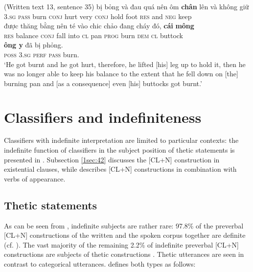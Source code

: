 \documentclass[output=paper]{langsci/langscibook}
\begin{document}
\begin{exe}
\ex\label{1ex:27}
(Written text 13, sentence 35)
\exi{}
  bị        bỏng  và         đau  quá   nên       ôm    {\textbf{chân}}  lên    và   không  giữ  \\
3.{\textsc{sg}}     {\textsc{pass}}  burn   {\textsc{conj}}  hurt  very  {\textsc{conj}}   hold  foot   {\textsc{res}}  and {\textsc{neg}}   keep \\
\glt
\exi{}
\gll được	 {thăng bằng}   nên      té   vào   chi{\dae}c chảo đang    cháy  đó,       {\textbf{cái}}   {\textbf{mông}} \\
{\textsc{res}}  balance          {\textsc{conj}}  fall into   {\textsc{cl}}    pan   {\textsc{prog}} burn   {\textsc{dem}}  {\textsc{cl}}  buttock \\
\exi{}
     {\textbf{ông {\daa}y}}  đã        bị        phỏng. \\
{\textsc{poss}} {\textsc{3.sg}}     {\textsc{perf}}  {\textsc{pass}}  burn.\\
\glt `He got burnt and he got hurt, therefore, he lifted [his] leg up to hold it, then he was no longer able to keep his balance to the extent that he fell down on [the] burning pan and [as a consequence] even [his] buttocks got burnt.'
\end{exe}


\section{Classifiers and indefiniteness}\label{sec:4}

Classifiers with indefinite interpretation are limited to particular contexts: the indefinite function of classifiers in the subject position of thetic statements is presented in . Subsection \ref{1sec:42} discusses the [CL+N] construction in existential clauses, while  describes [CL+N] constructions in combination with verbs of appearance.

\subsection{Thetic statements}\label{1sec:41}

As can be seen from , indefinite subjects are rather rare: 97.8\% of the preverbal [CL+N] constructions of the written and the spoken corpus together are definite (cf. ). The vast majority of the remaining 2.2\% of indefinite preverbal [CL+N] constructions are subjects of thetic constructions \citep{kuroda:72,sasse:87,sasse:95}. Thetic utterances are seen in contrast to categorical utterances. \cite{sasse:95} defines both types as follows:\\
\end{document}
